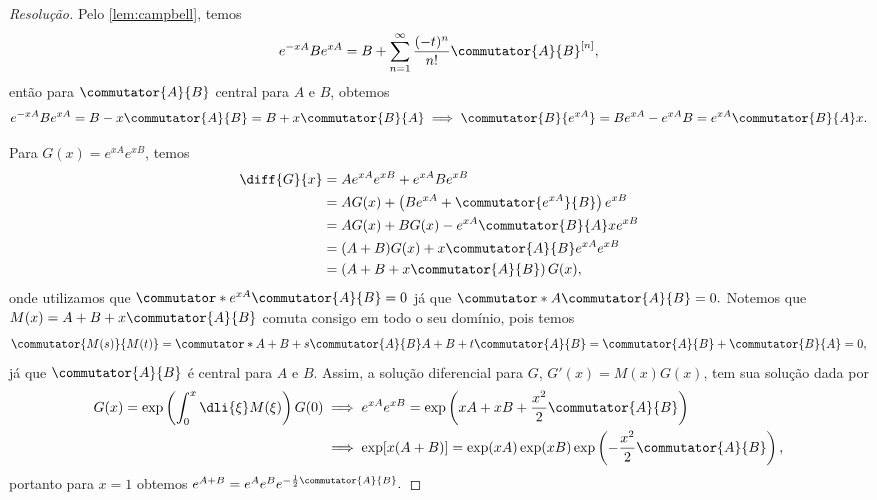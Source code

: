 \begin{proof}[Resolução]
    Pelo \cref{lem:campbell}, temos
    \begin{equation*}
        e^{-xA}Be^{xA} = B + \sum_{n = 1}^\infty \frac{(-t)^n}{n!} \commutator{A}{B}^{[n]},
    \end{equation*}
    então para \(\commutator{A}{B}\) central para \(A\) e \(B\), obtemos
    \begin{equation*}
        e^{-xA}Be^{xA} = B - x \commutator{A}{B} = B + x \commutator{B}{A} \implies \commutator{B}{e^{xA}} = B e^{xA} - e^{xA} B = e^{xA} \commutator{B}{A} x.
    \end{equation*}

    Para \(G(x) = e^{xA} e^{xB}\), temos
    \begin{align*}
        \diff{G}{x} &= A e^{xA} e^{xB} + e^{xA} B e^{xB}\\
                    &= A G(x) + \left(B e^{xA} + \commutator{e^{xA}}{B}\right) e^{xB}\\
                    &= A G(x) + B G(x) - e^{xA}\commutator{B}{A}x e^{xB}\\
                    &= (A + B) G(x) + x\commutator{A}{B} e^{xA}e^{xB}\\
                    &= \left(A + B + x \commutator{A}{B}\right) G(x),
    \end{align*}
    onde utilizamos que \(\commutator*{e^{xA}}{\commutator{A}{B}} = 0\) já que \(\commutator*{A}{\commutator{A}{B}} = 0.\) Notemos que \(M(x) = A + B + x\commutator{A}{B}\) comuta consigo em todo o seu domínio, pois temos
    \begin{equation*}
        \commutator{M(s)}{M(t)} = \commutator*{A + B + s\commutator{A}{B}}{A + B + t\commutator{A}{B}} = \commutator{A}{B} + \commutator{B}{A} = 0,
    \end{equation*}
    já que \(\commutator{A}{B}\) é central para \(A\) e \(B\). Assim, a solução diferencial para \(G\), \(G'(x) = M(x) G(x)\), tem sua solução dada por
    \begin{align*}
        G(x) = \exp\left(\int_0^x \dli{\xi} M(\xi)\right) G(0) 
        &\implies e^{xA} e^{xB} = \exp\left(xA + xB + \frac{x^2}{2}\commutator{A}{B}\right)\\
        &\implies \exp[x(A+B)] = \exp(xA) \exp(xB) \exp\left(- \frac{x^2}{2} \commutator{A}{B}\right),
    \end{align*}
    portanto para \(x = 1\) obtemos \(e^{A+B} = e^A e^B e^{-\frac12 \commutator{A}{B}}.\)
\end{proof}
